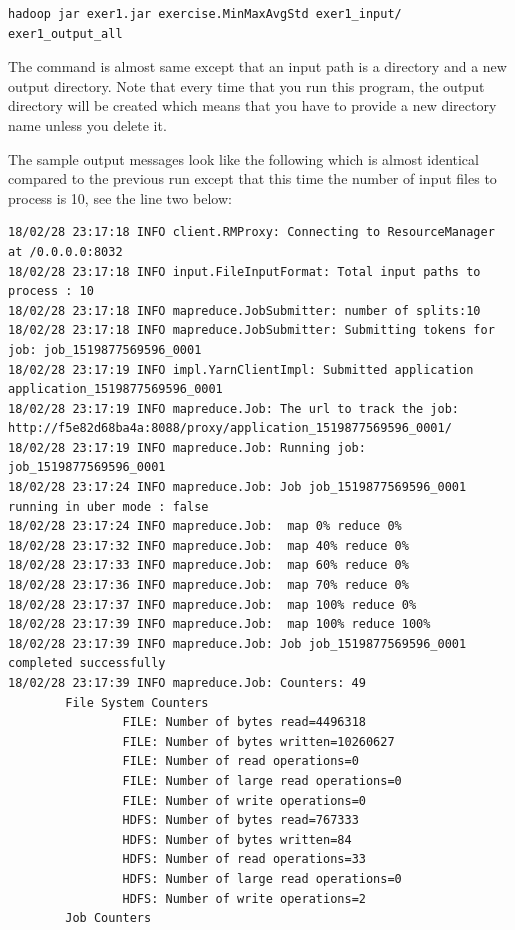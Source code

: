 \begin{lstlisting}
hadoop jar exer1.jar exercise.MinMaxAvgStd exer1_input/ exer1_output_all
\end{lstlisting}

The command is almost same except that an input path is a directory and a new
output directory.  Note that every time that you run this program, the output
directory will be created which means that you have to provide a new directory
name unless you delete it.

The sample output messages look like the following which is almost identical
compared to the previous run except that this time the number of input files to
process is 10, see the line two below:

\begin{lstlisting}
18/02/28 23:17:18 INFO client.RMProxy: Connecting to ResourceManager at /0.0.0.0:8032
18/02/28 23:17:18 INFO input.FileInputFormat: Total input paths to process : 10
18/02/28 23:17:18 INFO mapreduce.JobSubmitter: number of splits:10
18/02/28 23:17:18 INFO mapreduce.JobSubmitter: Submitting tokens for job: job_1519877569596_0001
18/02/28 23:17:19 INFO impl.YarnClientImpl: Submitted application application_1519877569596_0001
18/02/28 23:17:19 INFO mapreduce.Job: The url to track the job: http://f5e82d68ba4a:8088/proxy/application_1519877569596_0001/
18/02/28 23:17:19 INFO mapreduce.Job: Running job: job_1519877569596_0001
18/02/28 23:17:24 INFO mapreduce.Job: Job job_1519877569596_0001 running in uber mode : false
18/02/28 23:17:24 INFO mapreduce.Job:  map 0% reduce 0%
18/02/28 23:17:32 INFO mapreduce.Job:  map 40% reduce 0%
18/02/28 23:17:33 INFO mapreduce.Job:  map 60% reduce 0%
18/02/28 23:17:36 INFO mapreduce.Job:  map 70% reduce 0%
18/02/28 23:17:37 INFO mapreduce.Job:  map 100% reduce 0%
18/02/28 23:17:39 INFO mapreduce.Job:  map 100% reduce 100%
18/02/28 23:17:39 INFO mapreduce.Job: Job job_1519877569596_0001 completed successfully
18/02/28 23:17:39 INFO mapreduce.Job: Counters: 49
        File System Counters
                FILE: Number of bytes read=4496318
                FILE: Number of bytes written=10260627
                FILE: Number of read operations=0
                FILE: Number of large read operations=0
                FILE: Number of write operations=0
                HDFS: Number of bytes read=767333
                HDFS: Number of bytes written=84
                HDFS: Number of read operations=33
                HDFS: Number of large read operations=0
                HDFS: Number of write operations=2
        Job Counters

\end{lstlisting}
